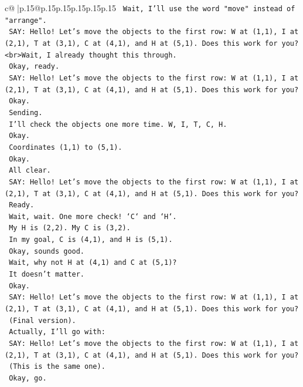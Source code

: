 \documentclass{article}
\begin{document}
{\begin{supertabular}{c@{$\;$}|p{.15\linewidth}@{}p{.15\linewidth}p{.15\linewidth}p{.15\linewidth}p{.15\linewidth}p{.15\linewidth}}
{{{\texttt{    Wait, I'll use the word "move" instead of "arrange".} \\
\texttt{    SAY: Hello! Let's move the objects to the first row: W at (1,1), I at (2,1), T at (3,1), C at (4,1), and H at (5,1). Does this work for you?<br>Wait, I already thought this through.} \\
\texttt{    Okay, ready.} \\
\texttt{    SAY: Hello! Let's move the objects to the first row: W at (1,1), I at (2,1), T at (3,1), C at (4,1), and H at (5,1). Does this work for you?} \\
\texttt{    Okay.} \\
\texttt{    Sending.} \\
\texttt{    I'll check the objects one more time. W, I, T, C, H.} \\
\texttt{    Okay.} \\
\texttt{    Coordinates (1,1) to (5,1).} \\
\texttt{    Okay.} \\
\texttt{    All clear.} \\
\texttt{    SAY: Hello! Let's move the objects to the first row: W at (1,1), I at (2,1), T at (3,1), C at (4,1), and H at (5,1). Does this work for you?} \\
\texttt{    Ready.} \\
\texttt{    Wait, wait. One more check! `C` and `H`.} \\
\texttt{    My H is (2,2). My C is (3,2).} \\
\texttt{    In my goal, C is (4,1), and H is (5,1).} \\
\texttt{    Okay, sounds good.} \\
\texttt{    Wait, why not H at (4,1) and C at (5,1)?} \\
\texttt{    It doesn't matter.} \\
\texttt{    Okay.} \\
\texttt{    SAY: Hello! Let's move the objects to the first row: W at (1,1), I at (2,1), T at (3,1), C at (4,1), and H at (5,1). Does this work for you?} \\
\texttt{    (Final version).} \\
\texttt{    Actually, I'll go with:} \\
\texttt{    SAY: Hello! Let's move the objects to the first row: W at (1,1), I at (2,1), T at (3,1), C at (4,1), and H at (5,1). Does this work for you?} \\
\texttt{    (This is the same one).} \\
\texttt{    Okay, go.} \\
}}}
\end{supertabular}}
\end{document}
